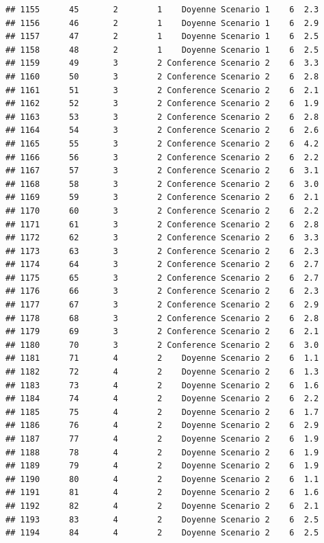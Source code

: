 \documentclass[
]{article}
\begin{document}
\begin{verbatim}
## 1155      45       2        1    Doyenne Scenario 1    6  2.3
## 1156      46       2        1    Doyenne Scenario 1    6  2.9
## 1157      47       2        1    Doyenne Scenario 1    6  2.5
## 1158      48       2        1    Doyenne Scenario 1    6  2.5
## 1159      49       3        2 Conference Scenario 2    6  3.3
## 1160      50       3        2 Conference Scenario 2    6  2.8
## 1161      51       3        2 Conference Scenario 2    6  2.1
## 1162      52       3        2 Conference Scenario 2    6  1.9
## 1163      53       3        2 Conference Scenario 2    6  2.8
## 1164      54       3        2 Conference Scenario 2    6  2.6
## 1165      55       3        2 Conference Scenario 2    6  4.2
## 1166      56       3        2 Conference Scenario 2    6  2.2
## 1167      57       3        2 Conference Scenario 2    6  3.1
## 1168      58       3        2 Conference Scenario 2    6  3.0
## 1169      59       3        2 Conference Scenario 2    6  2.1
## 1170      60       3        2 Conference Scenario 2    6  2.2
## 1171      61       3        2 Conference Scenario 2    6  2.8
## 1172      62       3        2 Conference Scenario 2    6  3.3
## 1173      63       3        2 Conference Scenario 2    6  2.3
## 1174      64       3        2 Conference Scenario 2    6  2.7
## 1175      65       3        2 Conference Scenario 2    6  2.7
## 1176      66       3        2 Conference Scenario 2    6  2.3
## 1177      67       3        2 Conference Scenario 2    6  2.9
## 1178      68       3        2 Conference Scenario 2    6  2.8
## 1179      69       3        2 Conference Scenario 2    6  2.1
## 1180      70       3        2 Conference Scenario 2    6  3.0
## 1181      71       4        2    Doyenne Scenario 2    6  1.1
## 1182      72       4        2    Doyenne Scenario 2    6  1.3
## 1183      73       4        2    Doyenne Scenario 2    6  1.6
## 1184      74       4        2    Doyenne Scenario 2    6  2.2
## 1185      75       4        2    Doyenne Scenario 2    6  1.7
## 1186      76       4        2    Doyenne Scenario 2    6  2.9
## 1187      77       4        2    Doyenne Scenario 2    6  1.9
## 1188      78       4        2    Doyenne Scenario 2    6  1.9
## 1189      79       4        2    Doyenne Scenario 2    6  1.9
## 1190      80       4        2    Doyenne Scenario 2    6  1.1
## 1191      81       4        2    Doyenne Scenario 2    6  1.6
## 1192      82       4        2    Doyenne Scenario 2    6  2.1
## 1193      83       4        2    Doyenne Scenario 2    6  2.5
## 1194      84       4        2    Doyenne Scenario 2    6  2.5

\end{verbatim}
\end{document}
